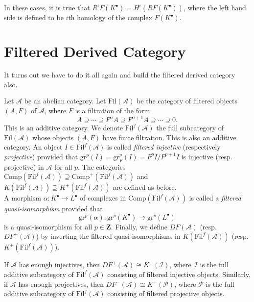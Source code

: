\begin{remark}
\label{remark-cohomology-of-derived-functor}
In these cases, it is true that $R^iF(K^\bullet) = H^i(RF(K^\bullet))$, where
the left hand side is defined to be $i$th homology of the complex
$F(K^\bullet)$.
\end{remark}




\section{Filtered Derived Category}
\label{section-filtered-derived-category}

\noindent
It turns out we have to do it all again and build the filtered derived
category also.

\begin{definition}
\label{definition-filtered}
Let $\mathcal{A}$ be an abelian category. Let $\text{Fil}(\mathcal{A})$ be the
category of filtered objects $(A,F)$ of $\mathcal{A}$, where $F$ is a
filtration of the form
$$
A \supseteq \cdots \supseteq F^n A \supseteq F^{n+1}A \supseteq \cdots
\supseteq 0.
$$
This is an additive category. We denote $\text{Fil}^f(\mathcal{A})$ the full
subcategory of $\text{Fil}(\mathcal{A})$ whose objects $(A,F)$ have finite
filtration. This is also an additive category. An object $I \in
\text{Fil}^f(\mathcal{A})$ is called {\it filtered injective} (respectively
{\it projective}) provided that $\text{gr}^p(I) = \text{gr}_F^p(I) =
F^pI/F^{p+1}I$ is injective (resp. projective) in $\mathcal{A}$ for all $p$.
The categories $\text{Comp}(\text{Fil}^f(\mathcal{A})) \supseteq
\text{Comp}^+(\text{Fil}^f(\mathcal{A}))$ and $K(\text{Fil}^f(\mathcal{A}))
\supseteq K^+(\text{Fil}^f(\mathcal A))$ are defined as before.
\\
A morphism $\alpha : K^\bullet \to L^\bullet$ of complexes in
$\text{Comp}(\text{Fil}^f(\mathcal{A}))$ is called a {\it filtered
quasi-isomorphism} provided that
$$
\mathrm{gr}^p(\alpha): \mathrm{gr}^p(K^\bullet) \to \mathrm{gr}^p(L^\bullet)
$$
is a quasi-isomorphism for all $p \in \mathbf{Z}$. Finally, we define $D
F(\mathcal{A})$ (resp. $D F^+(\mathcal{A})$) by inverting the filtered
quasi-isomorphisms in $K(\text{Fil}^f(\mathcal{A}))$ (resp.
$K^+(\text{Fil}^f(\mathcal{A}))$).
\end{definition}

\begin{lemma}
\label{lemma-filtered-derived-category}
If $\mathcal{A}$ has enough injectives, then $D F^+(\mathcal{A}) \cong
K^+(\mathcal{I})$, where $\mathcal{I}$ is the full additive subcategory of
$\text{Fil}^f(\mathcal{A})$ consisting of filtered injective objects.
Similarly, if $\mathcal{A}$ has enough projectives, then $D F^-(\mathcal{A})
\cong K^+(\mathcal{P})$, where $\mathcal P$ is the full additive subcategory of
$\text{Fil}^f(\mathcal{A})$ consisting of filtered projective objects.
\end{lemma}

